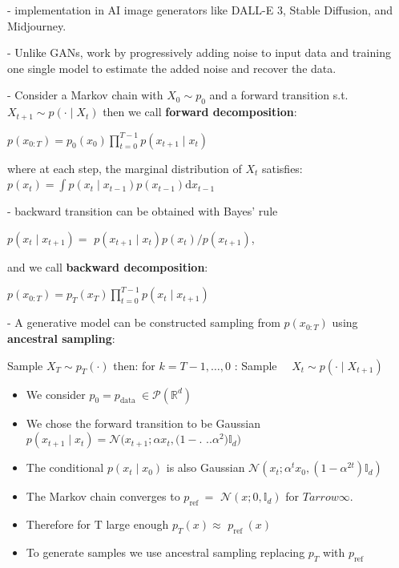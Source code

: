 - implementation in AI image generators like DALL-E 3, Stable Diffusion, and Midjourney. 

- Unlike GANs, work by progressively adding noise to input data and training one single model to estimate the added noise and recover the data.


- Consider a Markov chain with $X_{0} \sim p_{0}$ and a forward transition s.t. $X_{t+1} \sim p(\cdot \mid X_{t})$ then we call \textbf{forward decomposition}:

$
p(x_{0: T})=p_{0}(x_{0}) \prod_{t=0}^{T-1} p(x_{t+1} \mid x_{t})
$

where at each step, the marginal distribution of $X_{t}$ satisfies:
$
p(x_{t})=\int p(x_{t} \mid x_{t-1}) p(x_{t-1}) \mathrm{d} x_{t-1}
$

- backward transition can be obtained with Bayes' rule 

$p(x_{t} \mid x_{t+1})=$ $p(x_{t+1} \mid x_{t}) p(x_{t}) / p(x_{t+1})$, 

and we call \textbf{backward decomposition}:

$
p(x_{0: T})=p_{T}(x_{T}) \prod_{t=0}^{T-1} p(x_{t} \mid x_{t+1})
$

- A generative model can be constructed sampling from $p(x_{0: T})$ using \textbf{ancestral sampling}:

Sample $X_{T} \sim p_{T}(\cdot)$ then:
for $k=T-1, \ldots, 0$ :
Sample $\quad X_{t} \sim p(\cdot \mid X_{t+1})$

\begin{itemize}
  \item We consider $p_{0}=p_{\text {data }} \in \mathcal{P}(\mathbb{R}^{d})$

  \item We chose the forward transition to be Gaussian $p(x_{t+1} \mid x_{t})=\mathcal{N}(x_{t+1} ; \alpha x_{t},(1-.$ $..\alpha^{2}) \mathbb{I}_{d})$

  \item The conditional $p(x_{t} \mid x_{0})$ is also Gaussian $\mathcal{N}(x_{t} ; \alpha^{t} x_{0},(1-\alpha^{2 t}) \mathbb{I}_{d})$

  \item The Markov chain converges to $p_{\text {ref }}=$ $\mathcal{N}(x ; 0, \mathbb{I}_{d})$ for $T arrow \infty$.

  \item Therefore for $\mathrm{T}$ large enough $p_{T}(x) \approx$ $p_{\text {ref }}(x)$

  \item To generate samples we use ancestral sampling replacing $p_{T}$ with $p_{\text {ref}}$

\end{itemize}

